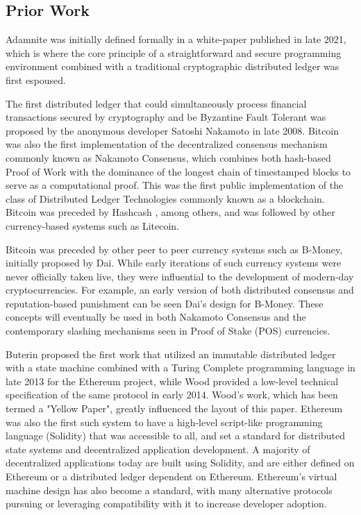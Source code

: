 \documentclass[conference]{IEEEtran}
\begin{document}
\subsection{Prior Work}
Adamnite was initially defined formally in a white-paper \cite{chaudhury2021Adamnite} published in late 2021, which is where the core principle of a straightforward and secure programming environment combined with a traditional cryptographic distributed ledger was first espoused.


The first distributed ledger that could simultaneously process financial transactions secured by cryptography and be Byzantine Fault Tolerant was proposed by the anonymous developer Satoshi Nakamoto \cite{nakamoto2008Bitcoin} in late 2008. Bitcoin was also the first implementation of the decentralized consensus mechanism commonly known as Nakamoto Consensus, which combines both hash-based Proof of Work with the dominance of the longest chain of timestamped blocks to serve as a computational proof. This was the first public implementation of the class of Distributed Ledger Technologies commonly known as a blockchain. Bitcoin was preceded by Hashcash \cite{back2002hashcash}, among others, and was followed by other currency-based systems such as Litecoin.

Bitcoin was preceded by other peer to peer currency systems such as B-Money, initially proposed by Dai. \cite{dai1998bmoney} While early iterations of such currency systems were never officially taken live, they were influential to the development of modern-day cryptocurrencies. For example, an early version of both distributed consensus and reputation-based punishment can be seen Dai's design for B-Money. These concepts will eventually be used in both Nakamoto Consensus and the contemporary slashing mechanisms seen in Proof of Stake (POS) currencies.

Buterin \cite{buterin2013Ethereum} proposed the first work that utilized an immutable distributed ledger with a state machine combined with a Turing Complete programming language in late 2013 for the Ethereum project, while Wood \cite{wood2014EthereumYellow} provided a low-level technical specification  of the same protocol in early 2014. Wood's work, which has been termed a "Yellow Paper", greatly influenced the layout of this paper. Ethereum was also the first such system to have a high-level script-like programming language (Solidity) that was accessible to all, and set a standard for distributed state systems and decentralized application development. A majority of decentralized applications today are built using Solidity, and are either defined on Ethereum or a distributed ledger dependent on Ethereum. Ethereum's virtual machine design has also become a standard, with many alternative protocols pursuing or leveraging compatibility with it to increase developer adoption. 
\end{document}
